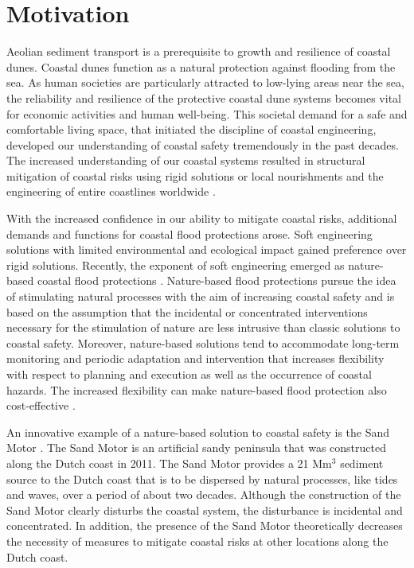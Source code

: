 \section{Motivation}

Aeolian sediment transport is a prerequisite to growth and resilience
of coastal dunes. Coastal dunes function as a natural protection
against flooding from the sea. As human societies are particularly
attracted to low-lying areas near the sea, the reliability and
resilience of the protective coastal dune systems becomes vital for
economic activities and human well-being. This societal demand for a
safe and comfortable living space, that initiated the discipline of
coastal engineering, developed our understanding of coastal safety
tremendously in the past decades. The increased understanding of our
coastal systems resulted in structural mitigation of coastal risks
using rigid solutions or local nourishments \citep{Hamm2002} and the
engineering of entire coastlines worldwide \citep{Donchyts2016}.

With the increased confidence in our ability to mitigate coastal
risks, additional demands and functions for coastal flood protections
arose. Soft engineering solutions with limited environmental and
ecological impact gained preference over rigid solutions. Recently,
the exponent of soft engineering emerged as nature-based coastal flood
protections \citep{Waterman2010, deVriend2015}. Nature-based flood
protections pursue the idea of stimulating natural processes with the
aim of increasing coastal safety and is based on the assumption that
the incidental or concentrated interventions necessary for the
stimulation of nature are less intrusive than classic solutions to
coastal safety. Moreover, nature-based solutions tend to accommodate
long-term monitoring and periodic adaptation and intervention that
increases flexibility with respect to planning and execution as well
as the occurrence of coastal hazards. The increased flexibility can
make nature-based flood protection also cost-effective
\citep{vanSlobbe2013}.

An innovative example of a nature-based solution to coastal safety is
the Sand Motor \citep[or Sand Engine,][]{Stive2013}. The Sand Motor is
an artificial sandy peninsula that was constructed along the Dutch
coast in 2011. The Sand Motor provides a 21 $\mathrm{Mm^3}$ sediment
source to the Dutch coast that is to be dispersed by natural
processes, like tides and waves, over a period of about two
decades. Although the construction of the Sand Motor clearly disturbs
the coastal system, the disturbance is incidental and concentrated. In
addition, the presence of the Sand Motor theoretically decreases the
necessity of measures to mitigate coastal risks at other locations
along the Dutch coast.

